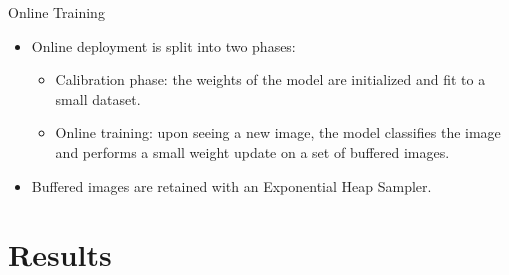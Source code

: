 \documentclass[10pt,handout]{beamer}
\begin{document}
\begin{frame}{Online Training}
\begin{itemize}

\item Online deployment is split into two phases:
\begin{itemize}
\item \alert{Calibration phase:} the weights of the model are initialized and fit to a small dataset.

\item \alert{Online training:} upon seeing a new image, the model classifies the image and performs a small weight update on a set of buffered images.
\end{itemize}

\pause

\item Buffered images are retained with an \alert{Exponential Heap Sampler}.\\[0.35cm]


\end{itemize}
\end{frame}

\section{Results}
\end{document}
